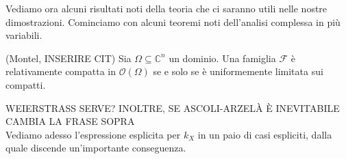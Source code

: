 Vediamo ora alcuni risultati noti della teoria che ci saranno utili nelle nostre dimostrazioni. Cominciamo con alcuni teoremi noti dell'analisi complessa in più variabili.

\begin{thm}
    (Montel, INSERIRE CIT) Sia $\Omega \subseteq \mathbb{C}^n$ un dominio. Una famiglia $\mathcal{F}$ è relativamente compatta in $\mathcal{O}(\Omega)$ se e solo se è uniformemente limitata sui compatti.
\end{thm}

WEIERSTRASS SERVE? INOLTRE, SE ASCOLI-ARZELÀ È INEVITABILE CAMBIA LA FRASE SOPRA\\

Vediamo adesso l'espressione esplicita per $k_X$ in un paio di casi espliciti, dalla quale discende un'importante conseguenza.

